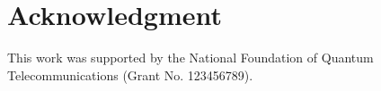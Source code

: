 \section*{Acknowledgment}

This work was supported by the National Foundation of Quantum Telecommunications (Grant No. 123456789).